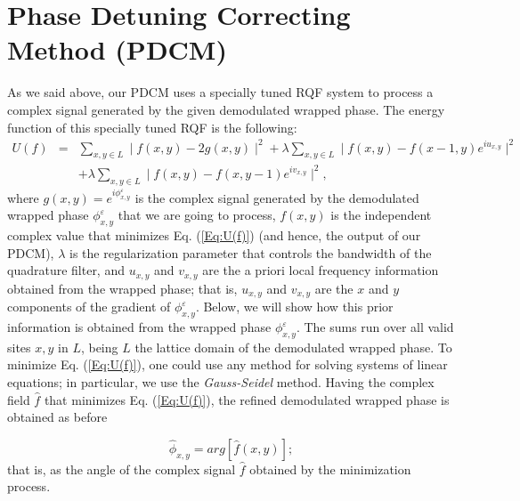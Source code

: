 \section{Phase Detuning Correcting Method (PDCM)}
As we said above, our PDCM uses a specially tuned RQF system to process a 
complex signal generated by the given demodulated wrapped phase. The energy
function of this specially tuned RQF is the following:
\begin{eqnarray}\label{Eq:U(f)}
U(f) &=& \sum_{x,y\in L} \mid f(x,y) - 2 g(x,y) \mid ^2 +\lambda \sum_{x,y\in L} 
  \mid f(x,y) - f(x-1,y) e^{i u_{x,y}} \mid^2 \nonumber\\
  & & + \lambda \sum_{x,y\in L} \mid f(x,y) - f(x,y-1) e^{i v_{x,y}} \mid^2,
\end{eqnarray}
where $g(x,y)= e^{i \phi^\varepsilon_{x,y}}$ is the complex
signal generated by the demodulated wrapped phase $\phi^\varepsilon_{x,y}$
that we are going to process, $f(x,y)$ is the independent complex value 
that minimizes Eq. (\ref{Eq:U(f)}) (and hence, the output of our PDCM), 
$\lambda$ is the regularization parameter that controls the bandwidth of the 
quadrature filter, and $u_{x,y}$ and $v_{x,y}$ are the a priori local frequency 
information obtained from the wrapped phase; 
that is, $u_{x,y}$ and $v_{x,y}$ are the $x$ and $y$ components of the 
gradient of $\phi^\varepsilon_{x,y}$. 
Below, we will show how this prior information is obtained from the wrapped
phase $\phi^\varepsilon_{x,y}$. The sums run over all valid sites $x,y$ in 
$L$, being $L$ the lattice domain of the demodulated wrapped phase. To minimize 
Eq. (\ref{Eq:U(f)}), one could use any method for solving systems of 
linear equations; in particular, we use the \emph{Gauss-Seidel} method. 
Having the complex field $\hat f$ that minimizes Eq. (\ref{Eq:U(f)}), the 
refined demodulated wrapped phase is obtained as before

\begin{equation}
	\hat{\phi}_{x,y}=arg[\hat{f}(x,y)];\label{Eq:phi}
\end{equation}
that is, as the angle of the complex signal $\hat f$ obtained by the
minimization process.

